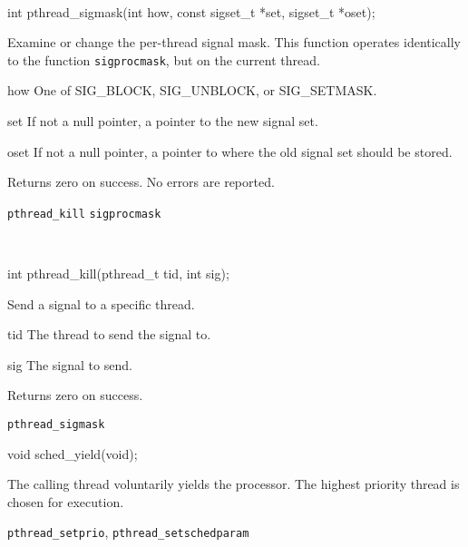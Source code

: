 \begin{apisyn}
	\\

	\funcproto int pthread_sigmask(int how,
				const sigset_t *set,
				\outparam sigset_t *oset);
\end{apisyn}
\begin{apidesc}
	Examine or change the per-thread signal mask. This function
	operates identically to the \posix{} function \texttt{sigprocmask},
	but on the current thread.
\end{apidesc}
\begin{apiparm}
	\item[how]
		One of SIG_BLOCK, SIG_UNBLOCK, or SIG_SETMASK.
	\item[set]
		If not a null pointer, a pointer to the new signal set.
	\item[oset]
		If not a null pointer, a pointer to where the old signal
		set should be stored.
\end{apiparm}
\begin{apiret}
	Returns zero on success. No errors are reported.
\end{apiret}
\begin{apirel}
	{\tt pthread_kill} {\tt sigprocmask}
\end{apirel}

\begin{apisyn}
	\\

	\funcproto int pthread_kill(pthread_t tid, int sig);
\end{apisyn}
\begin{apidesc}
	Send a signal to a specific thread.
\end{apidesc}
\begin{apiparm}
	\item[tid]
		The thread to send the signal to.
	\item[sig]
		The signal to send.
\end{apiparm}
\begin{apiret}
	Returns zero on success.
\end{apiret}
\begin{apirel}
	{\tt pthread_sigmask}
\end{apirel}

\begin{apisyn}

	\funcproto void sched_yield(void);
\end{apisyn}
\begin{apidesc}
	The calling thread voluntarily yields the processor. The highest
	priority thread is chosen for execution.
\end{apidesc}
\begin{apirel}
	{\tt pthread_setprio}, {\tt pthread_setschedparam}
\end{apirel}


